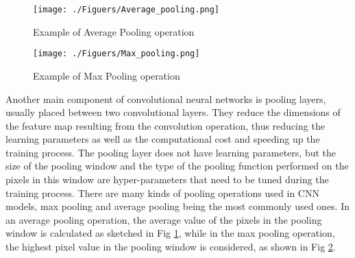 \documentclass[final,3p,times]{elsarticle}
\begin{document}
\begin{figure}[b]
	\centering 
	\texttt{[image: ./Figuers/Average\_pooling.png]} 
	\caption{Example of Average Pooling operation}
	\label{Average_pooling}
\end{figure}
\begin{figure}[t]
	\centering 
	\texttt{[image: ./Figuers/Max\_pooling.png]} 
	\caption{Example of Max Pooling operation}
	\label{Max_poolingg}
\end{figure}






Another main component of convolutional neural networks is pooling layers, usually placed between two convolutional layers. They reduce the dimensions of the feature map resulting from the convolution operation, thus reducing the learning parameters as well as the computational cost and speeding up the training process. The pooling layer does not have learning parameters, but the size of the pooling window and the type of the pooling function performed on the pixels in this window are hyper-parameters that need to be tuned during the training process. There are many kinds of pooling operations used in CNN models, max pooling and average pooling being the most commonly used ones. In an average pooling operation, the average value of the pixels in the pooling window is calculated as sketched in Fig \ref{Average_pooling}, while in the max pooling operation, the highest pixel value in the pooling window is considered, as shown in Fig \ref{Max_poolingg}.
\end{document}
